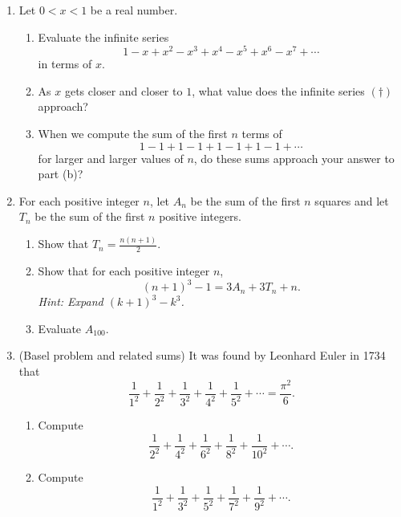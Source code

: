 \begin{enumerate}[resume]
\item Let $0 < x < 1$ be a real number.
\begin{enumerate}
\item Evaluate the infinite series
\begin{equation*}
1 - x + x^2 - x^3 + x^4 - x^5 + x^6 - x^7 + \cdots \tag{$\dagger$}
\end{equation*}
in terms of $x$.
\item As $x$ gets closer and closer to $1$, what value does the infinite series $(\dagger)$ approach?
\item When we compute the sum of the first $n$ terms of
\begin{equation*}
1 - 1 + 1 - 1 + 1 - 1 + 1 - 1 + \cdots
\end{equation*}
for larger and larger values of $n$, do these sums approach your answer to part (b)?
\end{enumerate}
\item For each positive integer $n$, let $A_n$ be the sum of the first $n$ squares and let $T_n$ be the sum of the first $n$ positive integers.
\begin{enumerate}
\item Show that $T_n = \frac{n(n + 1)}{2}$.
\item Show that for each positive integer $n$,
\begin{equation*}
(n + 1)^3 - 1 = 3A_n + 3T_n + n.
\end{equation*}
\emph{Hint: Expand $(k + 1)^3 - k^3$.}
\item Evaluate $A_{100}$.
\end{enumerate}
\item (Basel problem and related sums) It was found by Leonhard Euler in 1734 that
\begin{equation*}
\frac{1}{1^2} + \frac{1}{2^2} + \frac{1}{3^2} + \frac{1}{4^2} + \frac{1}{5^2} + \cdots = \frac{\pi^2}{6}.
\end{equation*}
\begin{enumerate}
\item Compute
\begin{equation*}
\frac{1}{2^2} + \frac{1}{4^2} + \frac{1}{6^2} + \frac{1}{8^2} + \frac{1}{10^2} + \cdots.
\end{equation*}
\item Compute
\begin{equation*}
\frac{1}{1^2} + \frac{1}{3^2} + \frac{1}{5^2} + \frac{1}{7^2} + \frac{1}{9^2} + \cdots.
\end{equation*}
\end{enumerate}
\end{enumerate}


